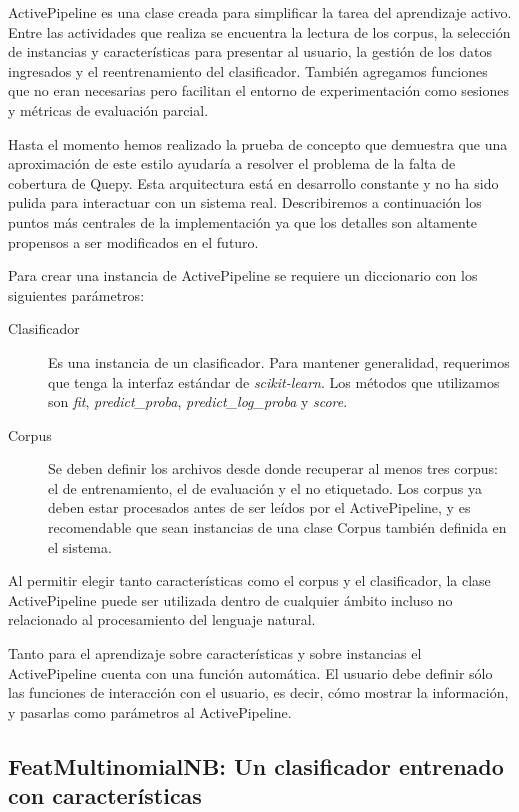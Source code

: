 ActivePipeline es una clase creada para simplificar la tarea del aprendizaje activo. Entre las actividades que realiza se encuentra la lectura de los corpus, la selección de instancias y características para presentar al usuario, la gestión de los datos ingresados y el reentrenamiento del clasificador. También agregamos funciones que no eran necesarias pero facilitan el entorno de experimentación como sesiones y métricas de evaluación parcial.

Hasta el momento hemos realizado la prueba de concepto que demuestra que una aproximación de este estilo ayudaría a resolver el problema de la falta de cobertura de Quepy. Esta arquitectura está en desarrollo constante y no ha sido pulida para interactuar con un sistema real. Describiremos a continuación los puntos más centrales de la implementación ya que los detalles son altamente propensos a ser modificados en el futuro.

Para crear una instancia de ActivePipeline se requiere un diccionario con los siguientes parámetros:
\begin{description}
    \item[Clasificador] Es una instancia de un clasificador. Para mantener generalidad, requerimos que tenga la interfaz estándar de \textit{scikit-learn}. Los métodos que utilizamos son \textit{fit}, \textit{predict\_proba}, \textit{predict\_log\_proba} y \textit{score}.
    \item[Corpus] Se deben definir los archivos desde donde recuperar al menos tres corpus: el de entrenamiento, el de evaluación y el no etiquetado. Los corpus ya deben estar procesados antes de ser leídos por el ActivePipeline, y es recomendable que sean instancias de una clase Corpus también definida en el sistema.
\end{description}
Al permitir elegir tanto características como el corpus y el clasificador, la clase ActivePipeline puede ser utilizada dentro de cualquier ámbito incluso no relacionado al procesamiento del lenguaje natural.

Tanto para el aprendizaje sobre características y sobre instancias el ActivePipeline cuenta con una función automática. El usuario debe definir sólo las funciones de interacción con el usuario, es decir, cómo mostrar la información, y pasarlas como parámetros al ActivePipeline.

\subsection{FeatMultinomialNB: Un clasificador entrenado con características}

